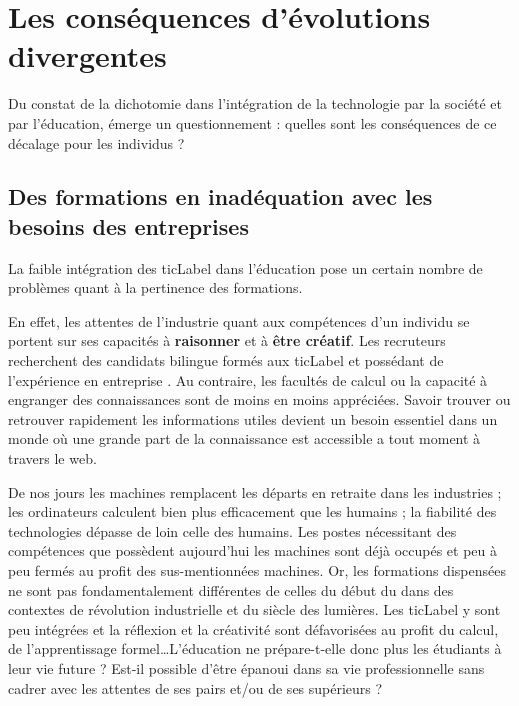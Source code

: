 
\part{Les conséquences d'évolutions divergentes}
Du constat de la dichotomie dans l'intégration de la technologie par la société et par l'éducation, émerge un questionnement : quelles sont les conséquences de ce décalage pour les individus ?



\chapter{Des formations en inadéquation avec les besoins des entreprises}
La faible intégration des \gls{ticLabel} dans l'éducation pose un certain nombre de problèmes quant à la pertinence des formations.

En effet, les attentes de l'industrie quant aux compétences d'un
individu se portent sur ses capacités à {\bf raisonner} et à {\bf être
  créatif}. Les recruteurs recherchent des candidats bilingue formés aux
\gls{ticLabel} et possédant de l'expérience en entreprise
\cite{DRH_criteres}. Au contraire, les facultés de calcul ou la
capacité à engranger des connaissances sont de moins en moins
appréciées. Savoir trouver ou retrouver rapidement les informations
utiles devient un besoin essentiel dans un monde où une grande part de
la connaissance est accessible a tout moment à travers le web.

De nos jours les machines remplacent les départs en retraite dans les industries ; les ordinateurs calculent bien plus efficacement que les humains ; la fiabilité des technologies dépasse de loin celle des humains. Les postes nécessitant des compétences que possèdent aujourd'hui les machines sont déjà occupés et peu à peu fermés au profit des sus-mentionnées machines. Or, les formations dispensées ne sont pas fondamentalement différentes de celles du début du   \cite{robinson2010paradigms} dans des contextes de révolution industrielle et du siècle des lumières. Les \gls{ticLabel} y sont peu intégrées et la réflexion et la créativité sont défavorisées au profit du calcul, de l'apprentissage formel\ldots L'éducation ne prépare-t-elle donc plus les étudiants à leur vie future \cite{formation_recrutement} ? Est-il possible d'être épanoui dans sa vie professionnelle sans cadrer avec les attentes de ses pairs et/ou de ses supérieurs ?

